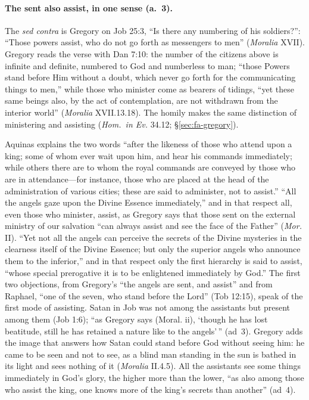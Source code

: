 \paragraph{The sent also assist, in one sense (a.~3).} The \emph{sed contra}
is Gregory on Job 25:3, ``Is there any numbering of his soldiers?'':
``Those powers assist, who do not go forth as messengers to men''
(\emph{Moralia} XVII). Gregory reads the verse with Dan 7:10: the number of
the citizens above is infinite and definite, numbered to God and numberless
to man; ``those Powers stand before Him without a doubt, which never go
forth for the communicating things to men,'' while those who minister come
as bearers of tidings, ``yet these same beings also, by the act of
contemplation, are not withdrawn from the interior world'' (\emph{Moralia}
XVII.13.18). The homily makes the same distinction of ministering and
assisting (\emph{Hom.\ in Ev.} 34.12; \S\ref{sec:fa-gregory}).

Aquinas explains the two words ``after the likeness of those who attend
upon a king; some of whom ever wait upon him, and hear his commands
immediately; while others there are to whom the royal commands are
conveyed by those who are in attendance---for instance, those who are
placed at the head of the administration of various cities; these are said
to administer, not to assist.'' ``All the angels gaze upon the Divine
Essence immediately,'' and in that respect all, even those who minister,
assist, as Gregory says that those sent on the external ministry of our
salvation ``can always assist and see the face of the Father'' (\emph{Mor.}
II). ``Yet not all the angels can perceive the secrets of the Divine
mysteries in the clearness itself of the Divine Essence; but only the
superior angels who announce them to the inferior,'' and in that respect
only the first hierarchy is said to assist, ``whose special prerogative it
is to be enlightened immediately by God.'' The first two objections, from
Gregory's ``the angels are sent, and assist'' and from Raphael, ``one of
the seven, who stand before the Lord'' (Tob 12:15), speak of the first
mode of assisting. Satan in Job was not among the assistants but present
among them (Job 1:6); ``as Gregory says (Moral. ii), `though he has lost
beatitude, still he has retained a nature like to the angels'\,'' (ad~3).
Gregory adds the image that answers how Satan could stand before God
without seeing him: he came to be seen and not to see, as a blind man
standing in the sun is bathed in its light and sees nothing of it
(\emph{Moralia} II.4.5). All the assistants see some things
immediately in God's glory, the higher more than the lower, ``as also among
those who assist the king, one knows more of the king's secrets than
another'' (ad~4).

